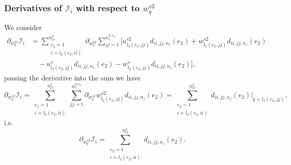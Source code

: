 \documentclass{article}
\begin{document}
\subsubsection{Derivatives of $\mathcal{I}_i$ with respect to $w_q^{s2}$} %
We consider
\begin{align}
\partial_{w_q^{s2}} \mathcal{I}_i &= \sum_{\substack{e_2=1\\ i=l_2(e_2,ii)}}^{n_{el}^2} \partial_{w_q^{s2}} \sum_{jj=1}^{n_v^{2,e_2}} \Bigg[ u_{l_2(e_2,jj)}^{s2} d_{ii,jj,n_r}(e_2) + w_{l_2(e_2,jj)}^{s2} d_{ii,jj,n_z}(e_2) \nonumber\\
&\quad - u_{l_2(e_2,jj)}^s d_{ii,jj,n_r}(e_2) - w_{l_2(e_2,jj)}^s d_{ii,jj,n_z}(e_2) \Bigg], \tag{8.20}
\end{align}
passing the derivative into the sum we have
\begin{equation}
\partial_{w_q^{s2}} \mathcal{I}_i = \sum_{\substack{e_2=1\\ i=l_2(e_2,ii)}}^{n_{el}^2} \sum_{jj=1}^{n_v^{2,e_2}} \partial_{w_q^{s2}} w_{l_2(e_2,jj)}^{s2} d_{ii,jj,n_z}(e_2) = \sum_{\substack{e_2=1\\ i=l_2(e_2,ii)}}^{n_{el}^2} d_{ii,jj,n_z}(e_2) \Big|_{q=l_2(e_2,jj)}, \tag{8.21}
\end{equation}
i.e.
\begin{equation}
\partial_{w_q^{s2}} \mathcal{I}_i = \sum_{\substack{e_2=1\\ i=l_2(e_2,ii)}}^{n_{el}^2} d_{ii,jj,n_z}(e_2). \tag{8.22}
\end{equation}
\end{document}
